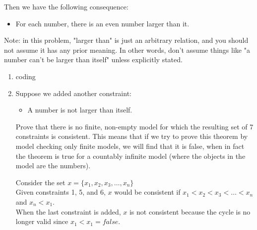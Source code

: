 \documentclass[10pt]{article}
\begin{document}
Then we have the following consequence:

\begin{itemize}
	\item For each number, there is an even number larger than it.
\end{itemize}

Note: in this problem, "larger than" is just an arbitrary relation, and you should not assume it has any prior meaning. In other words, don't assume things like "a number can't be larger than itself" unless explicitly stated.

\begin{enumerate}[label=(\alph*)]

  \item coding
  
  \item Suppose we added another constraint:
  \begin{itemize}
		\item A number is not larger than itself.
	\end{itemize}
	Prove that there is no finite, non-empty model for which the resulting set of 7 constraints is consistent. This means that if we try to prove this theorem by model checking only finite models, we will find that it is false, when in fact the theorem is true for a countably infinite model (where the objects in the model are the numbers).
	
	Consider the set $x = \{ x_1, x_2, x_3, \dots, x_n \}$\\
	Given constraints 1, 5, and 6, $x$ would be consistent if $x_1 < x_2 < x_3 < \dots < x_n$ and $x_n < x_1$.\\
	When the last constraint is added, $x$ is not consistent because the cycle is no longer valid since $x_1 < x_1 = false$.
  
\end{enumerate}
\end{document}

